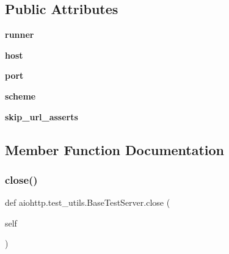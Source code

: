 \subsection*{Public Attributes}
\begin{DoxyCompactItemize}
\item 
\mbox{\label{classaiohttp_1_1test__utils_1_1_base_test_server_aa78252bd135ab28d323b2f71ba174f4e}} 
{\bfseries runner}
\item 
\mbox{\label{classaiohttp_1_1test__utils_1_1_base_test_server_a9bcb2fec2d5ecb26ded68136d10c8e7d}} 
{\bfseries host}
\item 
\mbox{\label{classaiohttp_1_1test__utils_1_1_base_test_server_a0d46b672a9d31ec7338d1cface555a60}} 
{\bfseries port}
\item 
\mbox{\label{classaiohttp_1_1test__utils_1_1_base_test_server_acd0bcf3900a5c94dc6efedfd9dcd59a1}} 
{\bfseries scheme}
\item 
\mbox{\label{classaiohttp_1_1test__utils_1_1_base_test_server_adcc147ff2b13ae5aa99fceb102b61fe1}} 
{\bfseries skip\+\_\+url\+\_\+asserts}
\end{DoxyCompactItemize}


\subsection{Member Function Documentation}
\mbox{\label{classaiohttp_1_1test__utils_1_1_base_test_server_af3478baeb930a629e3097e12931048ed}} 
\subsubsection{\texorpdfstring{close()}{close()}}
{\footnotesize\ttfamily def aiohttp.\+test\+\_\+utils.\+Base\+Test\+Server.\+close (\begin{DoxyParamCaption}\item[{}]{self }\end{DoxyParamCaption})}


